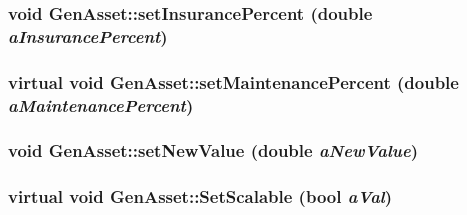 \label{class_gen_asset_afa9db65e8103f3379d2d947573965e80}
\hypertarget{class_gen_asset_af5618191f786b58058b554645238c7f0}{
\subsubsection[{setInsurancePercent}]{\setlength{\rightskip}{0pt plus 5cm}void GenAsset::setInsurancePercent (double {\em aInsurancePercent})}}
\label{class_gen_asset_af5618191f786b58058b554645238c7f0}
\hypertarget{class_gen_asset_a9c031c6de5995cf919e8279625b5906d}{
\subsubsection[{setMaintenancePercent}]{\setlength{\rightskip}{0pt plus 5cm}virtual void GenAsset::setMaintenancePercent (double {\em aMaintenancePercent})}}
\label{class_gen_asset_a9c031c6de5995cf919e8279625b5906d}
\hypertarget{class_gen_asset_ab98410163c3c96d2880af6dd1f851e13}{
\subsubsection[{setNewValue}]{\setlength{\rightskip}{0pt plus 5cm}void GenAsset::setNewValue (double {\em aNewValue})}}
\label{class_gen_asset_ab98410163c3c96d2880af6dd1f851e13}
\hypertarget{class_gen_asset_ae0db954e462a227f73c3abdfa3dd91a6}{
\subsubsection[{SetScalable}]{\setlength{\rightskip}{0pt plus 5cm}virtual void GenAsset::SetScalable (bool {\em aVal})}}
\label{class_gen_asset_ae0db954e462a227f73c3abdfa3dd91a6}


